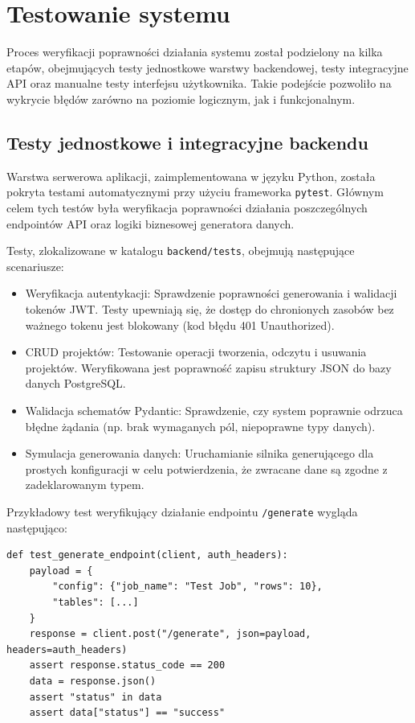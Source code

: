 \chapter{Testowanie systemu}

Proces weryfikacji poprawności działania systemu został podzielony na kilka etapów, obejmujących testy jednostkowe warstwy backendowej, testy integracyjne \gls{API} oraz manualne testy interfejsu użytkownika. Takie podejście pozwoliło na wykrycie błędów zarówno na poziomie logicznym, jak i funkcjonalnym.

\section{Testy jednostkowe i integracyjne backendu}
Warstwa serwerowa aplikacji, zaimplementowana w języku Python, została pokryta testami automatycznymi przy użyciu frameworka \texttt{pytest}. Głównym celem tych testów była weryfikacja poprawności działania poszczególnych endpointów \gls{API} oraz logiki biznesowej generatora danych.

Testy, zlokalizowane w katalogu \texttt{backend/tests}, obejmują następujące scenariusze:
\begin{itemize}
    \item Weryfikacja autentykacji: Sprawdzenie poprawności generowania i walidacji tokenów \gls{JWT}. Testy upewniają się, że dostęp do chronionych zasobów bez ważnego tokenu jest blokowany (kod błędu 401 Unauthorized).
    \item \gls{CRUD} projektów: Testowanie operacji tworzenia, odczytu i usuwania projektów. Weryfikowana jest poprawność zapisu struktury \gls{JSON} do bazy danych PostgreSQL.
    \item Walidacja schematów Pydantic: Sprawdzenie, czy system poprawnie odrzuca błędne żądania (np. brak wymaganych pól, niepoprawne typy danych).
    \item Symulacja generowania danych: Uruchamianie silnika generującego dla prostych konfiguracji w celu potwierdzenia, że zwracane dane są zgodne z zadeklarowanym typem.
\end{itemize}

Przykładowy test weryfikujący działanie endpointu \texttt{/generate} wygląda następująco:
\begin{verbatim}
def test_generate_endpoint(client, auth_headers):
    payload = {
        "config": {"job_name": "Test Job", "rows": 10},
        "tables": [...]
    }
    response = client.post("/generate", json=payload, headers=auth_headers)
    assert response.status_code == 200
    data = response.json()
    assert "status" in data
    assert data["status"] == "success"
\end{verbatim}


